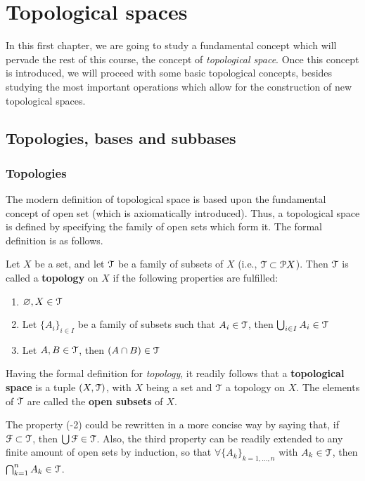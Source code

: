 \chapter{Topological spaces}\label{ch:topological-spaces}

In this first chapter, we are going to study a fundamental concept which will pervade
the rest of this course, the concept of \emph{topological space}.
Once this concept is introduced, we will proceed with some basic topological concepts,
besides studying the most important operations which allow for the construction of new
topological spaces.

\section{Topologies, bases and subbases}
\label{sec:topologies-bases-and-subbases}

\subsection{Topologies}
\label{subsec:topologies}

The modern definition of topological space is based upon the fundamental concept of
open  set (which is axiomatically introduced).
Thus, a topological space is defined by specifying the family of open sets which form it.
The formal definition is as follows.

\begin{definition}
	\label{def:topology}
	Let $X$ be a set, and let $\EuScript{T}$ be a family of subsets of $X$ (i.e., $\EuScript{T}\subset\EuScript{P} X$).
	Then $\EuScript{T}$ is called a \textbf{topology} on $X$ if the following properties are
	fulfilled:
	\begin{enumerate}
		\item $\varnothing, X\in \EuScript{T}$
		\item Let $\{A_i\}_{i\in I}$ be a family of subsets such that $A_i \in \EuScript{T}$,
		then $\bigcup_{i\in I} A_i\in\EuScript{T}$
		\item Let $A, B\in \EuScript{T}$, then $(A\cap B)\in \EuScript{T}$
	\end{enumerate}
\end{definition}

Having the formal definition for \emph{topology}, it readily follows that a
\textbf{topological space} is a tuple $(X, \EuScript{T})$, with $X$ being a set and $\EuScript{T}$ a
topology on $X$.
The elements of $\EuScript{T}$ are called the \textbf{open subsets} of $X$.

\begin{remark}
	The property (-2) could be rewritten in a more concise way by
	saying that, if $\EuScript{F}\subset\EuScript{T}$, then $\bigcup\EuScript{F}\in\EuScript{T}$.
	Also, the third property can be readily extended to any finite amount of open sets
	by induction, so that $\forall \{A_k\}_{k=1,\dots,n}$ with $A_k\in\EuScript{T}$, then
	$\bigcap_{k=1}^n A_k\in \EuScript{T}$.
\end{remark}

